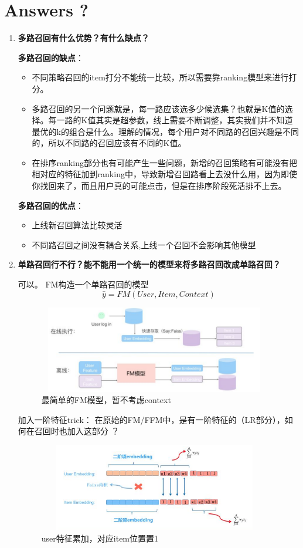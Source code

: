 \documentclass{article}
\begin{document}
\begin{CJK*}{UTF8}{gbsn}
\begin{itemize}
\end{itemize}


\section{Answers ?}
\begin{enumerate}
\item \textbf{ 多路召回有什么优势？有什么缺点？}

\textbf{多路召回的缺点}：
\begin{itemize}
\item 不同策略召回的item打分不能统一比较，所以需要靠ranking模型来进行打分。
\item 多路召回的另一个问题就是，每一路应该选多少候选集？也就是K值的选择。每一路的K值其实是超参数，线上需要不断调整，其实我们并不知道最优的k的组合是什么。理解的情况，每个用户对不同路的召回兴趣是不同的，所以不同路的召回应该有不同的K值。
\item 在排序ranking部分也有可能产生一些问题，新增的召回策略有可能没有把相对应的特征加到ranking中，导致新增召回路看上去没什么用，因为即使你找回来了，而且用户真的可能点击，但是在排序阶段死活排不上去。
\end{itemize}

\textbf{多路召回的优点}：
\begin{itemize}
\item 上线新召回算法比较灵活
\item 不同路召回之间没有耦合关系,上线一个召回不会影响其他模型
\end{itemize}

\item \textbf{ 单路召回行不行？能不能用一个统一的模型来将多路召回改成单路召回？}

可以。 FM构造一个单路召回的模型
$$\widehat{y}=FM(User,Item,Context)$$

\begin{figure}[H]
\centering
\includegraphics[width=4in,height=1.5in]{fm1}
\caption{最简单的FM模型，暂不考虑context}
\end{figure}
加入一阶特征trick： 在原始的FM/FFM中，是有一阶特征的（LR部分），如何在召回时也加入这部分 ？
\begin{figure}[H]
\centering
\includegraphics[width=4in,height=1.5in]{fm2}
\caption{user特征累加，对应item位置置1}
\end{figure}


\end{enumerate}
\end{CJK*}
\end{document}
